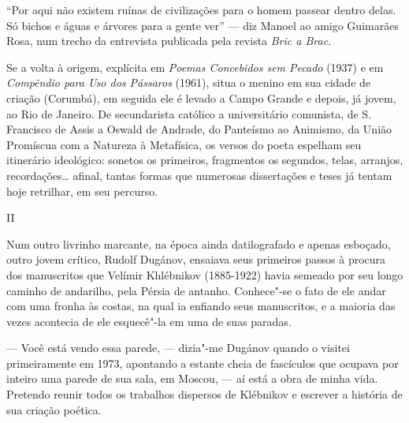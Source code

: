 ``Por aqui não existem ruínas de civilizações para o homem passear
dentro delas. Só bichos e águas e árvores para a gente ver'' --- diz
Manoel ao amigo Guimarães Rosa, num trecho da entrevista publicada pela
revista \emph{Bric a Brac.}

Se a volta à origem, explícita em \emph{Poemas Concebidos sem Pecado} (1937) e em \emph{Compêndio para Uso dos Pássaros} (1961), situa o menino
em sua cidade de criação (Corumbá), em seguida ele é levado a Campo
Grande e depois, já jovem, ao Rio de Janeiro. De secundarista católico a
universitário comunista, de S. Francisco de Assis a Oswald de Andrade,
do Panteísmo ao Animismo, da União Promíscua com a Natureza à
Metafísica, os versos do poeta espelham seu itinerário ideológico:
sonetos os primeiros, fragmentos os segundos, telas, arranjos,
recordações\ldots{} afinal, tantas formas que numerosas dissertações e teses
já tentam hoje retrilhar, em seu percurso.

II

Num outro livrinho marcante, na época ainda datilografado e apenas
esboçado, outro jovem crítico, Rudolf Dugánov, ensaiava seus primeiros
passos à procura dos manuscritos que Velímir Khlébnikov (1885-1922)
havia semeado por seu longo caminho de andarilho, pela Pérsia de
antanho. Conhece"-se o fato de ele andar com uma fronha às costas, na
qual ia enfiando seus manuscritos, e a maioria das vezes acontecia de
ele esquecê"-la em uma de suas paradas.

--- Você está vendo essa parede, --- dizia"-me Dugánov quando o visitei
primeiramente em 1973, apontando a estante cheia de fascículos que
ocupava por inteiro uma parede de sua sala, em Moscou, --- aí está a obra
de minha vida. Pretendo reunir todos os trabalhos dispersos de Klébnikov
e escrever a história de sua criação poética.

